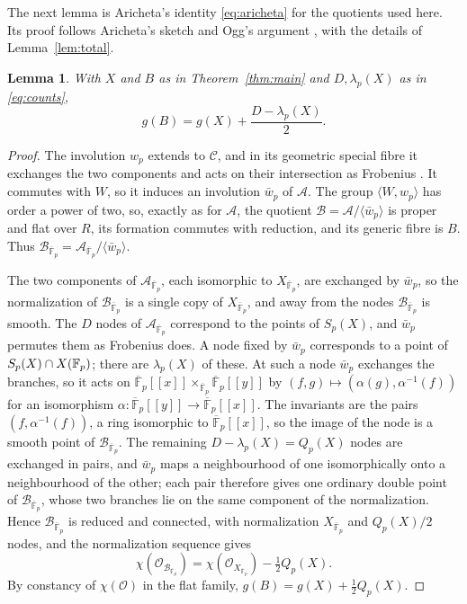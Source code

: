 \documentclass[11pt,a4paper]{article}
\newtheorem{lemma}[theorem]{Lemma}
\theoremstyle{remark}\newtheorem{remark}[theorem]{Remark}
\numberwithin{equation}{section}
\newcommand{\kk}{\overline{\mathbb F}_p}
\begin{document}
	The next lemma is Aricheta's identity \eqref{eq:aricheta} for the quotients used here. Its proof follows Aricheta's sketch and Ogg's argument \cite{OggRed}, with the details of Lemma~\ref{lem:total}.
	
	\begin{lemma}\label{lem:aricheta}
		With $X$ and $B$ as in Theorem~\ref{thm:main} and $D,\lambda_p(X)$ as in \eqref{eq:counts},
		\begin{equation}\label{eq:gB}
			g(B)=g(X)+\frac{D-\lambda_p(X)}2.
		\end{equation}
	\end{lemma}
	\begin{proof}
		The involution $w_p$ extends to $\mathscr C$, and in its geometric special fibre it exchanges the two components and acts on their intersection as Frobenius \cite[Proposition 3.8(i)]{Ribet}. It commutes with $W$, so it induces an involution $\bar w_p$ of $\mathscr A$. The group $\langle W,w_p\rangle$ has order a power of two, so, exactly as for $\mathscr A$, the quotient $\mathscr B=\mathscr A/\langle\bar w_p\rangle$ is proper and flat over $R$, its formation commutes with reduction, and its generic fibre is $B$. Thus $\mathscr B_{\kk}=\mathscr A_{\kk}/\langle\bar w_p\rangle$.
		
		The two components of $\mathscr A_{\kk}$, each isomorphic to $X_{\kk}$, are exchanged by $\bar w_p$, so the normalization of $\mathscr B_{\kk}$ is a single copy of $X_{\kk}$, and away from the nodes $\mathscr B_{\kk}$ is smooth. The $D$ nodes of $\mathscr A_{\kk}$ correspond to the points of $S_p(X)$, and $\bar w_p$ permutes them as Frobenius does. A node fixed by $\bar w_p$ corresponds to a point of $S_p(X)\cap X(\mathbb F_p)$; there are $\lambda_p(X)$ of these. At such a node $\bar w_p$ exchanges the branches, so it acts on $\kk[[x]]\times_{\kk}\kk[[y]]$ by $(f,g)\mapsto(\alpha(g),\alpha^{-1}(f))$ for an isomorphism $\alpha\colon\kk[[y]]\to\kk[[x]]$. The invariants are the pairs $(f,\alpha^{-1}(f))$, a ring isomorphic to $\kk[[x]]$, so the image of the node is a smooth point of $\mathscr B_{\kk}$. The remaining $D-\lambda_p(X)=Q_p(X)$ nodes are exchanged in pairs, and $\bar w_p$ maps a neighbourhood of one isomorphically onto a neighbourhood of the other; each pair therefore gives one ordinary double point of $\mathscr B_{\kk}$, whose two branches lie on the same component of the normalization. Hence $\mathscr B_{\kk}$ is reduced and connected, with normalization $X_{\kk}$ and $Q_p(X)/2$ nodes, and the normalization sequence gives
		\[
		\chi(\mathcal O_{\mathscr B_{\kk}})=\chi(\mathcal O_{X_{\kk}})-\tfrac12Q_p(X).
		\]
		By constancy of $\chi(\mathcal O)$ in the flat family, $g(B)=g(X)+\frac12Q_p(X)$.
	\end{proof}
	
\end{document}
